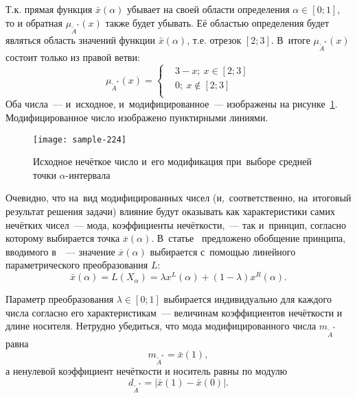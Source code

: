 Т.к. прямая функция $\bar{x}\left( \alpha  \right)$ убывает на своей области определения $\alpha \in \left[ 0;1 \right]$, то и обратная $\mu_{\tilde A^{*}}\left( x \right)$ также будет убывать. Её областью определения будет являться область значений функции $\bar{x}\left( \alpha  \right)$, т.е. отрезок $\left[ 2;3 \right]$. В~итоге $\mu_{\tilde A^{*}}\left( x \right)$ состоит только из правой ветви:
\begin{equation*}
	\mu_{\tilde A^{*}}\left( x \right)=\left\{
	\begin{aligned}
      & 3-x;\ x\in \left[ 2;3 \right] \\
      & 0;\ x\notin \left[ 2;3 \right] \\ 
    \end{aligned} \right.
\end{equation*}
Оба числа~--- и~исходное, и~модифицированное~--- изображены на рисунке~\ref{fig:sample-224}. Модифицированное число изображено пунктирными линиями.
\begin{figure}[h!]
  \centering
  {
    \texttt{[image: sample-224]}
    \caption{Исходное нечёткое число и~его модификация при~выборе средней точки $\alpha$-интервала}
    \label{fig:sample-224}
  }
\end{figure}

Очевидно, что на~вид модифицированных чисел (и,~соответственно, на~итоговый результат решения задачи) влияние будут оказывать как характеристики самих нечётких чисел~--- мода, коэффициенты нечёткости,~--- так и~принцип, согласно которому выбирается точка $\overline{x}\left( \alpha  \right)$. В~статье~\cite{Vorontsov_PI} предложено обобщение принципа, вводимого в~\cite{Lebedev}~--- значение $\overline{x}\left( \alpha  \right)$ выбирается с~помощью линейного параметрического преобразования $L$:
\begin{equation}
  \label{eq:L-transform-base}
  \bar{x}\left( \alpha  \right)=L\left( X_\alpha \right)=\lambda x^L \left( \alpha  \right)+\left( 1-\lambda  \right) x^R \left( \alpha  \right).
\end{equation}

Параметр преобразования $\lambda \in \left[ 0;1 \right]$ выбирается индивидуально для каждого числа согласно его характеристикам~--- величинам коэффициентов нечёткости и длине носителя. Нетрудно убедиться, что мода модифицированного числа $m_{\tilde A^{*}}$ равна
\begin{equation}
\label{eq:L-mode}
  m_{\tilde A^{*}}=\bar{x}\left( 1 \right),
\end{equation}
а ненулевой коэффициент нечёткости и носитель равны по модулю
\begin{equation}
\label{eq:L-support}
  d_{\tilde A^{*}}=\left| \bar{x}\left( 1 \right)-\bar{x}\left( 0 \right) \right|.
\end{equation}

